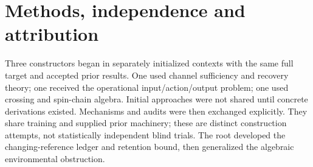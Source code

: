 \section*{Methods, independence and attribution}
Three constructors began in separately initialized contexts with the same
full target and accepted prior results. One used channel sufficiency and
recovery theory; one received the operational input/action/output problem;
one used crossing and spin-chain algebra. Initial approaches were not shared
until concrete derivations existed. Mechanisms and audits were then exchanged
explicitly. They share training and supplied prior machinery; these are
distinct construction attempts, not statistically independent blind trials.
The root developed the changing-reference ledger and retention bound, then
generalized the algebraic environmental obstruction.

